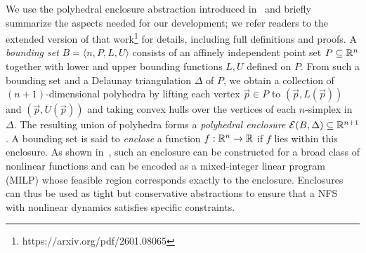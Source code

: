\documentclass[letterpaper, 10 pt, conference]{ieeeconf}  %
\begin{document}
We use the polyhedral enclosure abstraction introduced in~\cite{akinwande2025verifying} and briefly summarize the aspects needed for our development; we refer readers to the extended version of that work\footnote{https://arxiv.org/pdf/2601.08065} for details, including full definitions and proofs. 
A \emph{bounding set} $B = \langle n, P, L, U \rangle$ consists of an affinely independent point set $P \subseteq \mathbb{R}^n$ together with lower and upper bounding functions $L,U$ defined on $P$. 
From such a bounding set and a Delaunay triangulation $\Delta$ of $P$, we obtain a collection of $(n+1)$-dimensional polyhedra by lifting each vertex $\vec{p} \in P$ to $(\vec{p},L(\vec{p}))$ and $(\vec{p},U(\vec{p}))$ and taking convex hulls over the vertices of each $n$-simplex in $\Delta$. 
The resulting union of polyhedra forms a \emph{polyhedral enclosure} $\mathcal{E}(B,\Delta) \subseteq \mathbb{R}^{n+1}$. 
A bounding set is said to \emph{enclose} a function $f : \mathbb{R}^n \to \mathbb{R}$ if $f$ lies within this enclosure.
As shown in~\cite{akinwande2025verifying}, such an enclosure can be constructed for a broad class of nonlinear functions and can be encoded as a mixed-integer linear program (MILP) whose feasible region corresponds exactly to the enclosure.  Enclosures can thus be used as tight but conservative abstractions to ensure that a NFS with nonlinear dynamics satisfies specific constraints.
\end{document}
